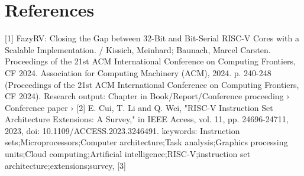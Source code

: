\documentclass[10pt,twocolumn]{article}
\begin{document}
\section*{References}
[1] FazyRV: Closing the Gap between 32-Bit and Bit-Serial RISC-V Cores with a Scalable Implementation. / Kissich, Meinhard; Baunach, Marcel Carsten.
Proceedings of the 21st ACM International Conference on Computing Frontiers, CF 2024. Association for Computing Machinery (ACM), 2024. p. 240-248 (Proceedings of the 21st ACM International Conference on Computing Frontiers, CF 2024).
Research output: Chapter in Book/Report/Conference proceeding › Conference paper ›
[2] E. Cui, T. Li and Q. Wei, "RISC-V Instruction Set Architecture Extensions: A Survey," in IEEE Access, vol. 11, pp. 24696-24711, 2023, doi: 10.1109/ACCESS.2023.3246491.
keywords: {Instruction sets;Microprocessors;Computer architecture;Task analysis;Graphics processing units;Cloud computing;Artificial intelligence;RISC-V;instruction set architecture;extensions;survey},
[3] 
\end{document}
